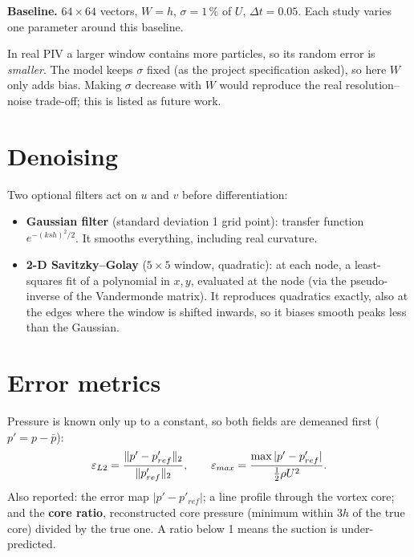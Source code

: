 \textbf{Baseline.} $64\times64$ vectors, $W=h$, $\sigma=1\,\%$ of $U$, $\Delta t=0.05$. Each study varies one parameter around this baseline.

\begin{pitfall}
In real PIV a larger window contains more particles, so its random error is \emph{smaller}. The model keeps $\sigma$ fixed (as the project specification asked), so here $W$ only adds bias. Making $\sigma$ decrease with $W$ would reproduce the real resolution--noise trade-off; this is listed as future work.
\end{pitfall}

\section{Denoising}
Two optional filters act on $u$ and $v$ before differentiation:
\begin{itemize}
\item \textbf{Gaussian filter} (standard deviation 1 grid point): transfer function $e^{-(k s h)^2/2}$. It smooths everything, including real curvature.
\item \textbf{2-D Savitzky--Golay} ($5\times5$ window, quadratic): at each node, a least-squares fit of a polynomial in $x,y$, evaluated at the node (via the pseudo-inverse of the Vandermonde matrix). It reproduces quadratics exactly, also at the edges where the window is shifted inwards, so it biases smooth peaks less than the Gaussian.
\end{itemize}

\section{Error metrics}
Pressure is known only up to a constant, so both fields are demeaned first ($p'=p-\bar p$):
\begin{equation}
\varepsilon_{L2}=\frac{\|p'-p'_{ref}\|_2}{\|p'_{ref}\|_2},\qquad
\varepsilon_{max}=\frac{\max|p'-p'_{ref}|}{\tfrac12\rho U^2}.
\end{equation}
Also reported: the error map $|p'-p'_{ref}|$; a line profile through the vortex core; and the \textbf{core ratio}, reconstructed core pressure (minimum within $3h$ of the true core) divided by the true one. A ratio below 1 means the suction is under-predicted.

